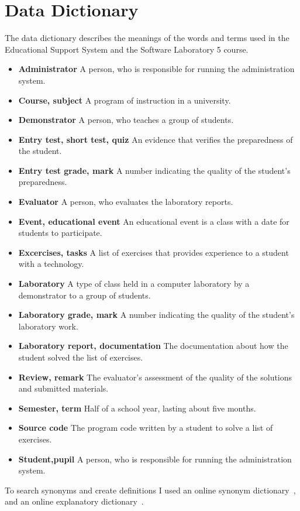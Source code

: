 \chapter{Data Dictionary}

The data dictionary describes the meanings of the words and terms used in the Educational Support System and the Software Laboratory 5 course.

\begin{itemize}
	\item \textbf{Administrator} A person, who is responsible for running the administration system.
	\item \textbf{Course, subject} A program of instruction in a university.
	\item \textbf{Demonstrator} A person, who teaches a group of students.
	\item \textbf{Entry test, short test, quiz} An evidence that verifies the preparedness of the student.
	\item \textbf{Entry test grade, mark} A number indicating the quality of the student's preparedness.
	\item \textbf{Evaluator} A person, who evaluates the laboratory reports.
	\item \textbf{Event, educational event} An educational event is a class with a date for students to participate.
	\item \textbf{Excercises, tasks} A list of exercises that provides experience to a student with a technology.
	\item \textbf{Laboratory} A type of class held in a computer laboratory by a demonstrator to a group of students.
	\item \textbf{Laboratory grade, mark} A number indicating the quality of the student's laboratory work.
	\item \textbf{Laboratory report, documentation} The documentation about how the student  solved the list of exercises.
	\item \textbf{Review, remark} The evaluator's assessment of the quality of the solutions and submitted materials.
	\item \textbf{Semester, term} Half of a school year, lasting about five months.
	\item \textbf{Source code} The program code written by a student to solve a list of exercises.
	\item \textbf{Student,pupil} A person, who is responsible for running the administration system.
\end{itemize}

To search synonyms and create definitions I used an online synonym dictionary~\cite{Thesaurus}, and an online explanatory  dictionary~\cite{Dictionary}.
